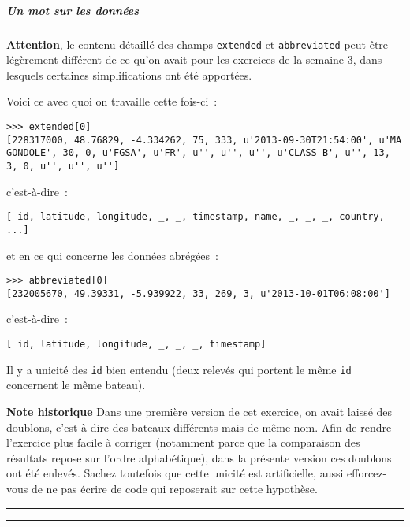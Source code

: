     \hypertarget{un-mot-sur-les-donnuxe9es}{%
\subparagraph{Un mot sur les données}\label{un-mot-sur-les-donnuxe9es}}

    \textbf{Attention}, le contenu détaillé des champs \texttt{extended} et
\texttt{abbreviated} peut être légèrement différent de ce qu'on avait
pour les exercices de la semaine 3, dans lesquels certaines
simplifications ont été apportées.

Voici ce avec quoi on travaille cette fois-ci~:

\begin{verbatim}
>>> extended[0]
[228317000, 48.76829, -4.334262, 75, 333, u'2013-09-30T21:54:00', u'MA GONDOLE', 30, 0, u'FGSA', u'FR', u'', u'', u'', u'CLASS B', u'', 13, 3, 0, u'', u'', u'']
\end{verbatim}

c'est-à-dire~:

\begin{verbatim}
[ id, latitude, longitude, _, _, timestamp, name, _, _, _, country, ...]
\end{verbatim}

et en ce qui concerne les données abrégées~:

\begin{verbatim}
>>> abbreviated[0]
[232005670, 49.39331, -5.939922, 33, 269, 3, u'2013-10-01T06:08:00']
\end{verbatim}

c'est-à-dire~:

\begin{verbatim}
[ id, latitude, longitude, _, _, _, timestamp]
\end{verbatim}

    Il y a unicité des \texttt{id} bien entendu (deux relevés qui portent le
même \texttt{id} concernent le même bateau).

\textbf{Note historique} Dans une première version de cet exercice, on
avait laissé des doublons, c'est-à-dire des bateaux différents mais de
même nom. Afin de rendre l'exercice plus facile à corriger (notamment
parce que la comparaison des résultats repose sur l'ordre alphabétique),
dans la présente version ces doublons ont été enlevés. Sachez toutefois
que cette unicité est artificielle, aussi efforcez-vous de ne pas écrire
de code qui reposerait sur cette hypothèse.

    \begin{center}\rule{0.5\linewidth}{\linethickness}\end{center}

    \begin{center}\rule{0.5\linewidth}{\linethickness}\end{center}

